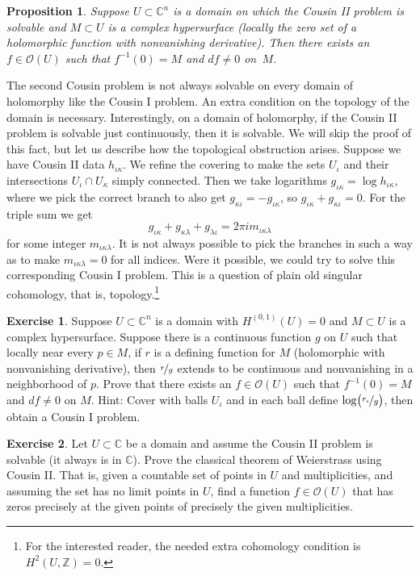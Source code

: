\documentclass[12pt,openany]{book}
\newcommand{\C}{{\mathbb{C}}}
\newcommand{\Z}{{\mathbb{Z}}}
\newcommand{\sO}{{\mathscr{O}}}
\theoremstyle{plain}
\newtheorem{prop}[thm]{Proposition}
\theoremstyle{remark}
\theoremstyle{definition}
\newenvironment{exbox}{%
    \def\FrameCommand{\vrule width 1pt \relax\hspace{10pt}}%
    \MakeFramed{\advance\hsize-\width\FrameRestore}%
}{%
    \endMakeFramed
}
\theoremstyle{exercise}
\newtheorem{exercise}{Exercise}[section]
\theoremstyle{example}
\begin{document}
\begin{prop}
Suppose $U \subset \C^n$ is a domain on which the Cousin II problem is
solvable and $M \subset U$ is a complex hypersurface (locally the zero set
of a holomorphic function with nonvanishing derivative).
Then there exists an $f \in \sO(U)$ such that $f^{-1}(0) = M$ and
$df \neq 0$ on~$M$.
\end{prop}

The second Cousin problem is not always solvable on every domain of
holomorphy like the Cousin I problem.  An extra condition on the topology of
the domain is necessary.  Interestingly, on a domain of holomorphy, if the
Cousin II problem is solvable just continuously, then it is solvable.
We will skip the proof of this fact, but let us describe how
the topological obstruction arises.
Suppose we have Cousin II data $h_{\iota\kappa}$.  We refine the
covering to make the sets $U_{\iota}$ and their intersections
$U_\iota\cap U_\kappa$ simply connected.  Then we take logarithms
$g_{\iota\kappa} = \log h_{\iota\kappa}$, where we pick the correct
branch to also get $g_{\kappa\iota} = -g_{\iota\kappa}$, so
$g_{\iota\kappa}+g_{\kappa\iota} = 0$.  For the triple sum
we get
\begin{equation*}
g_{\iota\kappa}+g_{\kappa\lambda}+g_{\lambda\iota} = 2\pi i
m_{\iota\kappa\lambda}
\end{equation*}
for some integer $m_{\iota\kappa\lambda}$.
It is not always possible to pick the branches in
such a way as to make $m_{\iota\kappa\lambda}=0$ for all indices.
Were it possible, we could try to solve
this corresponding Cousin I problem.
This is a question of
plain old singular cohomology, that is, topology.\footnote{%
For the interested reader, the needed extra cohomology condition is $H^2(U,\Z)=0$.}

\begin{exbox}
\begin{exercise}
\pagebreak[2]
Suppose $U \subset \C^n$ is a domain with $H^{(0,1)}(U)=0$
and $M \subset U$ is a complex hypersurface.
Suppose there is a continuous function $g$ on $U$
such that locally near every $p \in M$, if $r$ is a defining function for $M$
(holomorphic with nonvanishing derivative),
then $\nicefrac{r}{g}$ extends to be continuous and nonvanishing in a
neighborhood of $p$.  Prove that there exists an $f \in \sO(U)$
such that $f^{-1}(0) = M$ and $df \neq 0$ on $M$.
Hint: Cover with balls $U_{\iota}$ and in each ball define
$\log\bigl(\nicefrac{r_\iota}{g}\bigr)$, then obtain a Cousin I problem.
\end{exercise}

\begin{exercise}
\pagebreak[2]
Let $U \subset \C$ be a domain and
assume the Cousin II problem is solvable (it always is in $\C$).
Prove the classical theorem of Weierstrass using Cousin II\@.  That is,
given a countable set of points in $U$ and multiplicities, and assuming the
set has no limit points in $U$, find a function $f \in \sO(U)$ that has
zeros precisely at the given points of precisely the given multiplicities.
\end{exercise}
\end{exbox}
\end{document}
